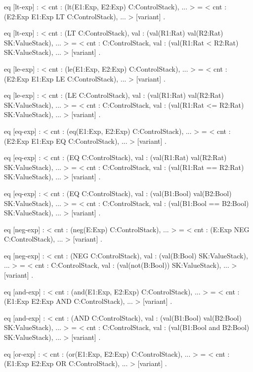 \documentclass{llncs}%
\begin{document}
    eq [lt-exp] :
        < cnt : (lt(E1:Exp, E2:Exp) C:ControlStack), ... > 
     =
        < cnt : (E2:Exp E1:Exp LT C:ControlStack), ... > [variant] .

    eq [lt-exp] :
        < cnt : (LT C:ControlStack),
          val : (val(R1:Rat) val(R2:Rat) SK:ValueStack), ... > 
     =
        < cnt : C:ControlStack,
          val : (val(R1:Rat < R2:Rat) SK:ValueStack), ... > [variant] .

    eq [le-exp] :
        < cnt : (le(E1:Exp, E2:Exp) C:ControlStack), ... > 
     =
        < cnt : (E2:Exp E1:Exp LE C:ControlStack), ... > [variant] .

    eq [le-exp] :
        < cnt : (LE C:ControlStack),
          val : (val(R1:Rat) val(R2:Rat) SK:ValueStack), ... > 
     =
        < cnt : C:ControlStack,
          val : (val(R1:Rat <= R2:Rat) SK:ValueStack), ... > [variant] .

    eq [eq-exp] :
        < cnt : (eq(E1:Exp, E2:Exp) C:ControlStack), ... > 
     =
        < cnt : (E2:Exp E1:Exp EQ C:ControlStack), ... > [variant] .

    eq [eq-exp] :
        < cnt : (EQ C:ControlStack),
          val : (val(R1:Rat) val(R2:Rat) SK:ValueStack), ... > 
     =
        < cnt : C:ControlStack,
          val : (val(R1:Rat == R2:Rat) SK:ValueStack), ... > [variant] .

    eq [eq-exp] :
        < cnt : (EQ C:ControlStack),
          val : (val(B1:Bool) val(B2:Bool) SK:ValueStack), ... > 
     =
        < cnt : C:ControlStack,
          val : (val(B1:Bool == B2:Bool) SK:ValueStack), ... > [variant] .

    eq [neg-exp] :
        < cnt : (neg(E:Exp) C:ControlStack), ... > 
     =
        < cnt : (E:Exp NEG C:ControlStack), ... > [variant] .

    eq [neg-exp] :
        < cnt : (NEG C:ControlStack),
          val : (val(B:Bool) SK:ValueStack), ... > 
     =
        < cnt : C:ControlStack,
          val : (val(not(B:Bool)) SK:ValueStack), ... > [variant] .

    eq [and-exp] :
        < cnt : (and(E1:Exp, E2:Exp) C:ControlStack), ... > 
     =
        < cnt : (E1:Exp E2:Exp AND C:ControlStack), ... > [variant] .

    eq [and-exp] :
        < cnt : (AND C:ControlStack),
          val : (val(B1:Bool) val(B2:Bool) SK:ValueStack), ... > 
     =
        < cnt : C:ControlStack,
          val : (val(B1:Bool and B2:Bool) SK:ValueStack), ... > [variant] .

    eq [or-exp] :
        < cnt : (or(E1:Exp, E2:Exp) C:ControlStack), ... > 
     =
        < cnt : (E1:Exp E2:Exp OR C:ControlStack), ... > [variant] .
\end{document}
